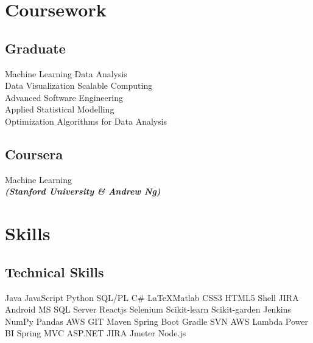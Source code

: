 \documentclass[]{aj-resume-openfont}
\begin{document}
\begin{minipage}[t]{0.33\textwidth}

\section{Coursework}
\subsection{Graduate}
\textbullet{} Machine Learning\textbullet{} Data Analysis\\
\textbullet{} Data Visualization\textbullet{} Scalable Computing\\
\textbullet{} Advanced Software Engineering\\
\textbullet{} Applied Statistical Modelling\\
\textbullet{} Optimization Algorithms for Data Analysis\\
\sectionsep

\subsection{Coursera}
Machine Learning \\
{\footnotesize \textit{\textbf{(Stanford University \& Andrew Ng) }}} \\
\sectionsep



\section{Skills}
\subsection{Technical Skills}
\textbullet{}Java \textbullet{}JavaScript \textbullet{}Python
\textbullet{}SQL/PL \textbullet{}C\# \textbullet{}\LaTeX \textbullet{}Matlab
\textbullet{}CSS3 \textbullet{}HTML5 \textbullet{}Shell
\textbullet{}JIRA \textbullet{}Android 
\textbullet{}MS SQL Server \textbullet{}Reactjs \textbullet{}Selenium 
\textbullet{}Scikit-learn \textbullet{}Scikit-garden \textbullet{}Jenkins 
\textbullet{}NumPy \textbullet{}Pandas \textbullet{}AWS \textbullet{}GIT 
\textbullet{}Maven \textbullet{}Spring Boot  \textbullet{}Gradle 
 \textbullet{}SVN \textbullet{}AWS Lambda \textbullet{}Power BI
\textbullet{}Spring MVC  \textbullet{}ASP.NET \textbullet{}JIRA \textbullet{}Jmeter
\textbullet{}Node.js \\
\sectionsep

\end{minipage}
\end{document}
